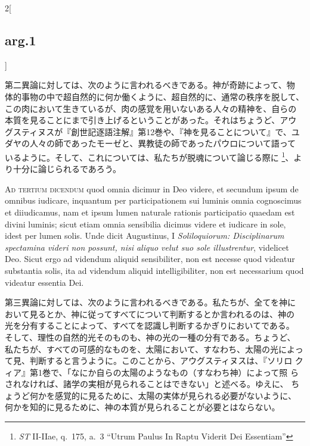 \documentclass[paper=a4paper,fontsize=10pt,jafontsize=9pt,titlepage]{jlreq}
\begin{document}
\begin{paracol}{2}[\subsection{arg.1}]
\switchcolumn

第二異論に対しては、次のように言われるべきである。神が奇跡によって、物
体的事物の中で超自然的に何か働くように、超自然的に、通常の秩序を脱して、
この肉において生きているが、肉の感覚を用いないある人々の精神を、自らの
本質を見ることにまで引き上げるということがあった。それはちょうど、アウ
グスティヌスが『創世記逐語注解』第12巻や、『神を見ることについて』で、ユ
ダヤの人々の師であったモーゼと、異教徒の師であったパウロについて語って
いるように。そして、これについては、私たちが脱魂について論じる際に
\footnote{{\itshape ST} II-IIae, q.~175, a.~3 ``Utrum Paulus In Raptu
Viderit Dei Essentiam''}、より十分に論じられるであろう。

\switchcolumn*[\subsection{ad.3}]

{\scshape Ad tertium dicendum} quod omnia dicimur in Deo videre, et
secundum ipsum de omnibus iudicare, inquantum per participationem sui
luminis omnia cognoscimus et diiudicamus, nam et ipsum lumen naturale
rationis participatio quaedam est divini luminis; sicut etiam omnia
sensibilia dicimus videre et iudicare in sole, idest per lumen
solis. Unde dicit Augustinus, I {\itshape Soliloquiorum: Disciplinarum
spectamina videri non possunt, nisi aliquo velut suo sole
illustrentur}, videlicet Deo. Sicut ergo ad videndum aliquid
sensibiliter, non est necesse quod videatur substantia solis, ita ad
videndum aliquid intelligibiliter, non est necessarium quod videatur
essentia Dei.

\switchcolumn

第三異論に対しては、次のように言われるべきである。私たちが、全てを神に
おいて見るとか、神に従ってすべてについて判断するとか言われるのは、神の
光を分有することによって、すべてを認識し判断するかぎりにおいてである。
そして、理性の自然的光そのものも、神の光の一種の分有である。ちょうど、
私たちが、すべての可感的なものを、太陽において、すなわち、太陽の光によっ
て見、判断すると言うように。このことから、アウグスティヌスは、『ソリロ
クィア』第1巻で、「なにか自らの太陽のようなもの（すなわち神）によって照
らされなければ、諸学の実相が見られることはできない」と述べる。ゆえに、
ちょうど何かを感覚的に見るために、太陽の実体が見られる必要がないように、
何かを知的に見るために、神の本質が見られることが必要とはならない。

\switchcolumn*[\subsection{ad.4}]


\end{paracol}
\end{document}
